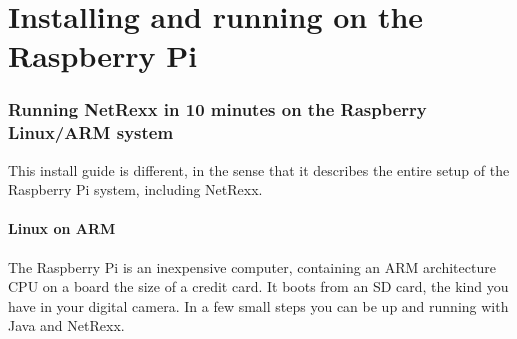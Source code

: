 \chapter{Installing and running on the Raspberry Pi}
\subsection{Running NetRexx in 10 minutes on the Raspberry Linux/ARM system}
This install guide is different, in the sense that it describes the entire setup of the Raspberry Pi system, including NetRexx.

\subsubsection{Linux on ARM}
The Raspberry Pi is an inexpensive computer, containing an ARM architecture CPU on a board the size of a credit card. It boots from an SD card, the kind you have in your digital camera. In a few small steps you can be up and running with Java and NetRexx. 
